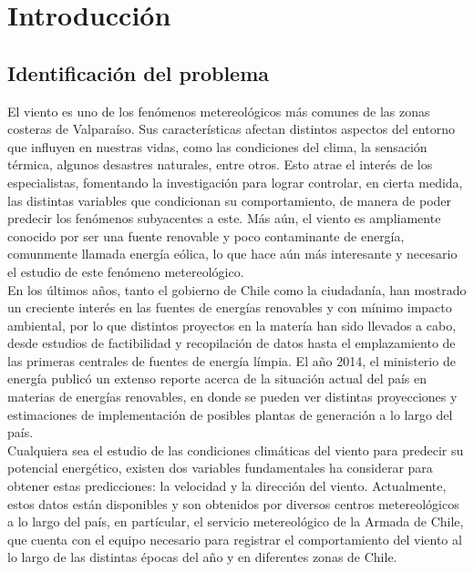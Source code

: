 
\chapter{Introducción}

\section{Identificación del problema}
El viento es uno de los fenómenos metereológicos más comunes de las zonas costeras de Valparaíso. Sus características afectan distintos aspectos del entorno que influyen en nuestras vidas, como las condiciones del clima, la sensación térmica, algunos desastres naturales, entre otros. Esto atrae el interés de los especialistas, fomentando la investigación para lograr controlar, en cierta medida, las distintas variables que condicionan su comportamiento, de manera de poder predecir los fenómenos subyacentes a este. Más aún, el viento es ampliamente conocido por ser una fuente renovable y poco contaminante de energía, comunmente llamada energía eólica, lo que hace aún más interesante y necesario el estudio de este fenómeno metereológico.\\
En los últimos años, tanto el gobierno de Chile como la ciudadanía, han mostrado un creciente interés en las fuentes de energías renovables y con mínimo impacto ambiental, por lo que distintos proyectos en la matería han sido llevados a cabo, desde estudios de factibilidad y recopilación de datos hasta el emplazamiento de las primeras centrales de fuentes de energía límpia. El año 2014, el ministerio de energía publicó un extenso reporte acerca de la situación actual del país en materias de energías renovables, en donde se pueden ver distintas proyecciones y estimaciones de implementación de posibles plantas de generación a lo largo del país. \cite{minenergia14}\\
Cualquiera sea el estudio de las condiciones climáticas del viento para predecir su potencial energético, existen dos variables fundamentales ha considerar para obtener estas predicciones: la velocidad y la dirección del viento. Actualmente, estos datos están disponibles y son obtenidos por diversos centros metereológicos a lo largo del país, en partícular, el servicio metereológico de la Armada de Chile, que cuenta con el equipo necesario para registrar el comportamiento del viento al lo largo de las distintas épocas del año y en diferentes zonas de Chile.\\
